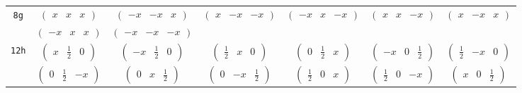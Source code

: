 \documentclass[fleqn,9pt,landscape]{jsarticle}
\begin{document}
\begin{center}
\begin{longtable}{ccccccc}
{\tt 8g} & $ \begin{pmatrix} x & x & x \end{pmatrix} $ & $ \begin{pmatrix} - x & - x & x \end{pmatrix} $ & $ \begin{pmatrix} x & - x & - x \end{pmatrix} $ & $ \begin{pmatrix} - x & x & - x \end{pmatrix} $ & $ \begin{pmatrix} x & x & - x \end{pmatrix} $ & $ \begin{pmatrix} x & - x & x \end{pmatrix} $ \\
& $ \begin{pmatrix} - x & x & x \end{pmatrix} $ & $ \begin{pmatrix} - x & - x & - x \end{pmatrix} $ & $  $ & $  $ & $  $ & $  $ \\ \hline
{\tt 12h} & $ \begin{pmatrix} x & \frac{1}{2} & 0 \end{pmatrix} $ & $ \begin{pmatrix} - x & \frac{1}{2} & 0 \end{pmatrix} $ & $ \begin{pmatrix} \frac{1}{2} & x & 0 \end{pmatrix} $ & $ \begin{pmatrix} 0 & \frac{1}{2} & x \end{pmatrix} $ & $ \begin{pmatrix} - x & 0 & \frac{1}{2} \end{pmatrix} $ & $ \begin{pmatrix} \frac{1}{2} & - x & 0 \end{pmatrix} $ \\
& $ \begin{pmatrix} 0 & \frac{1}{2} & - x \end{pmatrix} $ & $ \begin{pmatrix} 0 & x & \frac{1}{2} \end{pmatrix} $ & $ \begin{pmatrix} 0 & - x & \frac{1}{2} \end{pmatrix} $ & $ \begin{pmatrix} \frac{1}{2} & 0 & x \end{pmatrix} $ & $ \begin{pmatrix} \frac{1}{2} & 0 & - x \end{pmatrix} $ & $ \begin{pmatrix} x & 0 & \frac{1}{2} \end{pmatrix} $ \\ \hline

\end{longtable}
\end{center}
\end{document}
